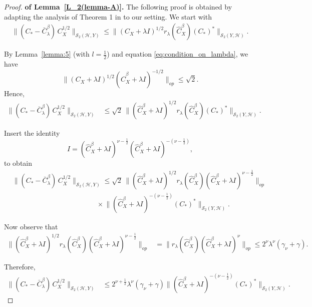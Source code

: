 \documentclass[twoside,11pt]{article}
\begin{document}
\begin{proof}\textbf{of Lemma~\ref{L_2(lemma-A)}.}
The following proof is obtained by adapting the analysis of Theorem 1 in \cite{Gupta_2025} to our setting. We start with
\begin{align*}
\big\|(C_*-\bar{C}_{\lambda}^\beta)\, C_X^{1/2} \big\|_{\mathcal S_2(\mathcal H,Y)}
\leq
\bigl\|
(C_X+\lambda I)^{1/2}
r_\lambda(\widehat C_{X}^{\beta}) (C_*)^*
\bigr\|_{\mathcal S_2(Y,\mathcal H)} .
\end{align*}

\noindent
By Lemma~\ref{lemma:5} (with $l=\tfrac12$) and equation \eqref{eq:condition_on_lambda}, we have 
\[
\big\|(C_X+\lambda I)^{1/2}(\widehat{C}^{\beta}_{X}+\lambda I)^{-1/2}\big\|_{op}
\le \sqrt{2}.
\]
Hence,
\begin{align*}
\big\|(C_*-\bar{C}_{\lambda}^\beta)\, C_X^{1/2} \big\|_{\mathcal S_2(\mathcal H,Y)}
&\le \sqrt{2} \,
\bigl\|
(\widehat{C}^{\beta}_{X}+\lambda I)^{1/2}
r_\lambda(\widehat C_X^{\beta})
(C_*)^*
\bigr\|_{\mathcal S_2(Y,\mathcal H)} .
\end{align*}

\noindent
Insert the identity
\[
I
=
(\widehat C_X^{\beta}+\lambda I)^{\nu-\frac12}
(\widehat C_X^{\beta}+\lambda I)^{-(\nu-\frac12)},
\]
to obtain
\begin{align*}
&\big\|(C_*-\bar{C}_{\lambda}^\beta)\, C_X^{1/2} \big\|_{\mathcal S_2(\mathcal H,Y)} \le \sqrt{2} \,
\bigl\|
(\widehat{C}^{\beta}_{X}+\lambda I)^{1/2}
r_\lambda(\widehat C_X^{\beta})
(\widehat C_X^{\beta}+\lambda I)^{\nu-\frac12}\bigr\|_{op}\\
&\hspace{12em} \times \bigl\|(\widehat C_X^{\beta}+\lambda I)^{-(\nu-\frac12)}
(C_*)^*
\bigr\|_{\mathcal S_2(Y,\mathcal H)} .
\end{align*}

\noindent
Now observe that
\begin{align*}
\bigl\|
(\widehat{C}_{X}^{\beta} +\lambda I)^{1/2}
r_\lambda(\widehat C_X^{\beta})
(\widehat C_X^{\beta}+\lambda I)^{\nu-\frac12}
\bigr\|_{{op}}
&=
\bigl\|
r_\lambda(\widehat C_X^{\beta})
(\widehat C_X^{\beta}+\lambda I)^\nu
\bigr\|_{{op}}  \le
2^\nu \lambda^\nu(\gamma_\nu+\gamma).
\end{align*}

\noindent
Therefore,
\begin{align*}
\big\|(C_*-\bar{C}_{\lambda}^\beta)\, C_X^{1/2} \big\|_{\mathcal S_2(\mathcal H,Y)}
&\le
2^{\nu+\frac12}\lambda^\nu(\gamma_\nu+\gamma)
\bigl\|
(\widehat C_X^{\beta}+\lambda I)^{-(\nu-\frac12)}
(C_*)^*
\bigr\|_{\mathcal S_2(Y,\mathcal H)} .
\end{align*}


\end{proof}
\end{document}
